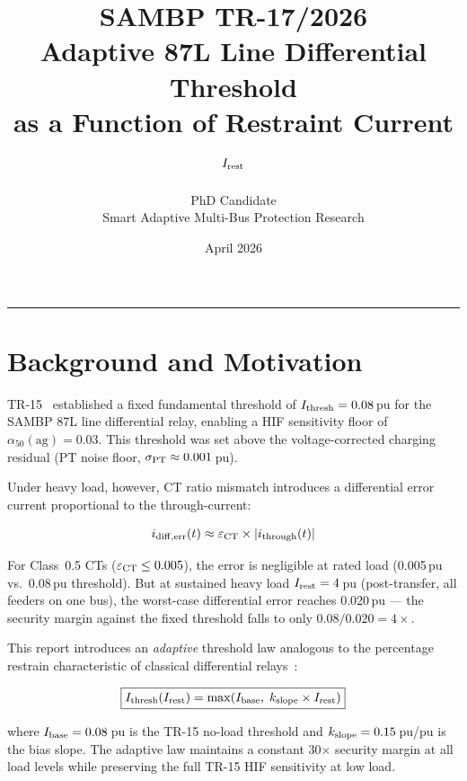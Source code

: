 \documentclass[11pt, a4paper]{article}
\title{\textbf{SAMBP TR-17/2026}\\[4pt]
       \large Adaptive 87L Line Differential Threshold\\
       as a Function of Restraint Current $I_{\rm rest}$}
\author{PhD Candidate\\[2pt]
        \small Smart Adaptive Multi-Bus Protection Research}
\date{April 2026}
\begin{document}
\maketitle
\tableofcontents
\vspace{6pt}\hrule\vspace{10pt}

\section{Background and Motivation}
\label{sec:background}

TR-15~\cite{SAMBP_TR15} established a fixed fundamental threshold of
$I_{\rm thresh} = 0.08$\,pu for the SAMBP 87L line differential relay,
enabling a HIF sensitivity floor of $\alpha_{50}(\text{ag}) = 0.03$.
This threshold was set above the voltage-corrected charging residual
(PT noise floor, $\sigma_{\rm PT} \approx 0.001$\,pu).

Under heavy load, however, CT ratio mismatch introduces a differential
error current proportional to the through-current:

\begin{equation}
  i_{\rm diff,err}(t) \approx \varepsilon_{\rm CT} \times |i_{\rm through}(t)|
\end{equation}

For Class~0.5 CTs ($\varepsilon_{\rm CT} \leq 0.005$), the error is
negligible at rated load (0.005\,pu vs.\ 0.08\,pu threshold).  But at
sustained heavy load $I_{\rm rest} = 4$\,pu (post-transfer, all feeders on
one bus), the worst-case differential error reaches 0.020\,pu --- the
security margin against the fixed threshold falls to only
$0.08 / 0.020 = 4\times$.

This report introduces an \emph{adaptive} threshold law analogous to the
percentage restrain characteristic of classical differential
relays~\cite{Anderson1999,Blackburn2006}:

\begin{equation}
  \boxed{I_{\rm thresh}(I_{\rm rest}) = \max\!\left(I_{\rm base},\;
         k_{\rm slope} \times I_{\rm rest}\right)}
  \label{eq:law}
\end{equation}

where $I_{\rm base} = 0.08$\,pu is the TR-15 no-load threshold and
$k_{\rm slope} = 0.15$\,pu/pu is the bias slope.  The adaptive law
maintains a constant 30$\times$ security margin at all load levels while
preserving the full TR-15 HIF sensitivity at low load.
\end{document}
